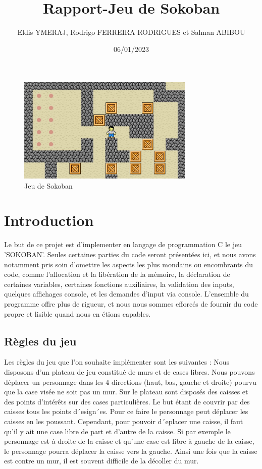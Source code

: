 \documentclass{article}
\title{Rapport-Jeu de Sokoban}
\author{Eldis YMERAJ, Rodrigo FERREIRA RODRIGUES et Salman ABIBOU}
\date{06/01/2023}
\begin{document}
\maketitle

\begin{figure}[h]
    \centering
    \includegraphics[width=0.75\textwidth]{sokoban-1735.jpg}
    \caption{Jeu de Sokoban}
    
\end{figure}

\newpage

\tableofcontents

\newpage

\section*{Introduction}


Le but de ce projet est d'implementer en langage de programmation C le jeu 'SOKOBAN'.
\newline
Seules certaines parties du code seront présentées ici, et nous avons notamment pris soin d'omettre les aspects les plus mondains ou encombrants du code, comme l’allocation et la libération de la mémoire, la déclaration de certaines variables, certaines fonctions
auxiliaires, la validation des inputs, quelques affichages console, et les demandes d’input via console. L’ensemble du programme offre plus de rigueur, et nous nous sommes efforcés de fournir du code propre et lisible quand nous en étions capables.

\subsection{Règles du jeu}
Les règles du jeu que l’on souhaite implémenter sont les suivantes :
Nous disposons d’un plateau de jeu constitué de murs et de cases libres. Nous pouvons déplacer
un personnage dans les 4 directions (haut, bas, gauche et droite) pourvu que la case visée ne
soit pas un mur.
Sur le plateau sont disposés des caisses et des points d’intérêts sur des cases particulières. Le but étant de couvrir par des caisses tous les points d´esign´es. Pour ce faire le personnage peut
déplacer les caisses en les poussant. Cependant, pour pouvoir d´eplacer une caisse, il faut qu’il y
ait une case libre de part et d’autre de la caisse. Si par exemple le personnage est à droite de la caisse et qu’une case est libre à gauche de la caisse, le personnage pourra déplacer la caisse vers la gauche. Ainsi une fois que la caisse est contre un mur, il est souvent difficile de la décoller du mur.
\end{document}
